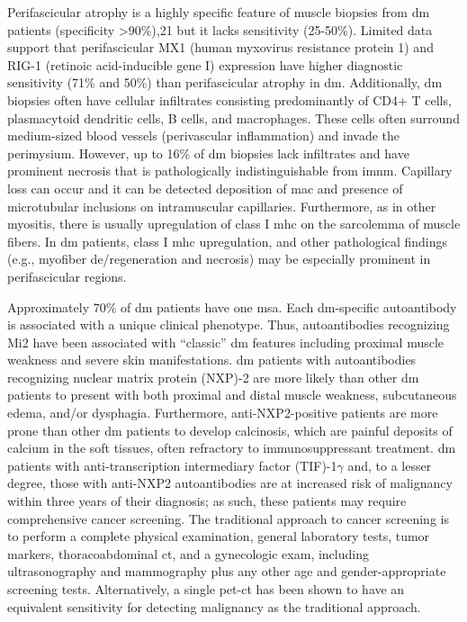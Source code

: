 Perifascicular atrophy is a highly specific feature of muscle biopsies from \gls{dm} patients (specificity >90\%),21 but it lacks sensitivity (25-50\%).\cite{SuarezCalvet2017,PinalFernandez2015} Limited data support that perifascicular MX1 (human myxovirus resistance protein 1) and RIG-1 (retinoic acid-inducible gene I) expression have higher diagnostic sensitivity (71\% and 50\%) than perifascicular atrophy in \gls{dm}.\cite{SuarezCalvet2017,Uruha2017} Additionally, \gls{dm} biopsies often have cellular infiltrates consisting predominantly of CD4+ T cells, plasmacytoid dendritic cells, B cells, and macrophages.\cite{Dalakas2002} These cells often surround medium-sized blood vessels (perivascular inflammation) and invade the perimysium.\cite{Dalakas2002} However, up to 16\% of \gls{dm} biopsies lack infiltrates and have prominent necrosis that is pathologically indistinguishable from \gls{imnm}.\cite{PinalFernandez2015} Capillary loss can occur and it can be detected deposition of \gls{mac} and presence of microtubular inclusions on intramuscular capillaries.\cite{Dalakas2002} Furthermore, as in other myositis, there is usually upregulation of class I \gls{mhc} on the sarcolemma of muscle fibers. In \gls{dm} patients, class I \gls{mhc} upregulation, and other pathological findings (e.g., myofiber de/regeneration and necrosis) may be especially prominent in perifascicular regions.\cite{Dalakas2002}

Approximately 70\% of \gls{dm} patients have one \gls{msa}.\cite{Betteridge2016} Each \gls{dm}-specific autoantibody is associated with a unique clinical phenotype. Thus, autoantibodies recognizing Mi2 have been associated with “classic” \gls{dm} features including proximal muscle weakness and severe skin manifestations.\cite{Ghirardello2005} \gls{dm} patients with autoantibodies recognizing nuclear matrix protein (NXP)-2 are more likely than other \gls{dm} patients to present with both proximal and distal muscle weakness, subcutaneous edema, and/or dysphagia.\cite{Albayda2017} Furthermore, anti-NXP2-positive patients are more prone than other \gls{dm} patients to develop calcinosis, which are painful deposits of calcium in the soft tissues, often refractory to immunosuppressant treatment.\cite{Albayda2017} \gls{dm} patients with anti-transcription intermediary factor (TIF)-1$\gamma$ and, to a lesser degree, those with anti-NXP2 autoantibodies are at increased risk of malignancy within three years of their diagnosis; as such, these patients may require comprehensive cancer screening.\cite{Albayda2017,Fiorentino2013,TralleroAraguas2012} The traditional approach to cancer screening is to perform a complete physical examination, general laboratory tests, tumor markers, thoracoabdominal \gls{ct}, and a gynecologic exam, including ultrasonography and mammography plus any other age and gender-appropriate screening tests. Alternatively, a single \gls{pet}-\gls{ct} has been shown to have an equivalent sensitivity for detecting malignancy as the traditional approach.\cite{SelvaOCallaghan2010}

